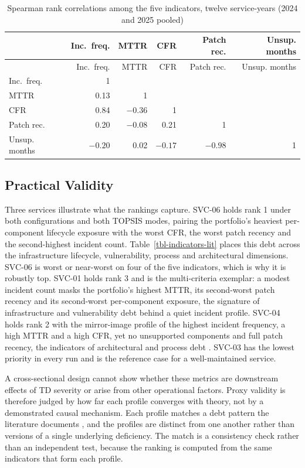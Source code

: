 \documentclass[
  authoryear,
  preprint]{elsarticle}
\begin{document}
\begin{longtable}[]{@{}lrrrrr@{}}
\caption{Spearman rank correlations among the five indicators, twelve
service-years (2024 and 2025
pooled)}\label{tbl-correlation}\tabularnewline
\toprule\noalign{}
& Inc.~freq. & MTTR & CFR & Patch rec. & Unsup. months \\
\midrule\noalign{}
\endfirsthead
\toprule\noalign{}
& Inc.~freq. & MTTR & CFR & Patch rec. & Unsup. months \\
\midrule\noalign{}
\endhead
\bottomrule\noalign{}
\endlastfoot
Inc.~freq. & 1 & & & & \\
MTTR & 0.13 & 1 & & & \\
CFR & 0.84 & \(-0.36\) & 1 & & \\
Patch rec. & 0.20 & \(-0.08\) & 0.21 & 1 & \\
Unsup. months & \(-0.20\) & 0.02 & \(-0.17\) & \(-0.98\) & 1 \\
\end{longtable}

\subsection{Practical Validity}\label{sec-practical}

Three services illustrate what the rankings capture. SVC-06 holds rank 1
under both configurations and both TOPSIS modes, pairing the portfolio's
heaviest per-component lifecycle exposure with the worst CFR, the worst
patch recency and the second-highest incident count.
Table~\ref{tbl-indicators-lit} places this debt across the
infrastructure lifecycle, vulnerability, process and architectural
dimensions. SVC-06 is worst or near-worst on four of the five
indicators, which is why it is robustly top. SVC-01 holds rank 3 and is
the multi-criteria exemplar: a modest incident count masks the
portfolio's highest MTTR, its second-worst patch recency and its
second-worst per-component exposure, the signature of infrastructure and
vulnerability debt behind a quiet incident profile. SVC-04 holds rank 2
with the mirror-image profile of the highest incident frequency, a high
MTTR and a high CFR, yet no unsupported components and full patch
recency, the indicators of architectural and process debt
\citep{detoledoReducingIncidentsMicroservices2021, nordExamplesTechnicalDebts2021}.
SVC-03 has the lowest priority in every run and is the reference case
for a well-maintained service.

A cross-sectional design cannot show whether these metrics are
downstream effects of TD severity or arise from other operational
factors. Proxy validity is therefore judged by how far each profile
converges with theory, not by a demonstrated causal mechanism. Each
profile matches a debt pattern the literature documents
\citep{hakiDigitalNudgingTechnical2023, ramasubbuControllingTechnicalDebt2021, nordExamplesTechnicalDebts2021},
and the profiles are distinct from one another rather than versions of a
single underlying deficiency. The match is a consistency check rather
than an independent test, because the ranking is computed from the same
indicators that form each profile.
\end{document}
